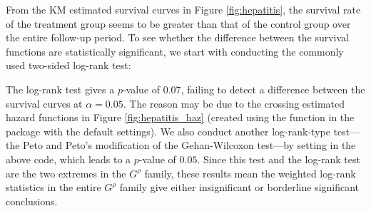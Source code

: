 From the KM estimated survival curves in Figure \ref{fig:hepatitis}, 
the survival rate of the treatment group seems to be greater than that of the control group over the entire follow-up period. To see whether the difference between the survival functions are statistically significant, %
we start with conducting the commonly used two-sided log-rank test: \\ 
\noindent The log-rank test gives a $p$-value of $0.07$, failing to detect a difference between the survival curves at $$. The reason may be due to the crossing estimated hazard functions in Figure \ref{fig:hepatitis_haz} (created using the function  in the package  with the default settings).
We also conduct another log-rank-type test---the Peto and Peto's modification of the Gehan-Wilcoxon test---by setting  in the above code, which leads to a $p$-value of $0.05$. 
Since this test and the log-rank test are the two extremes in the $G^\rho$ family, these results mean the weighted log-rank statistics in the entire $G^\rho$ family give either insignificant or borderline significant conclusions. 


